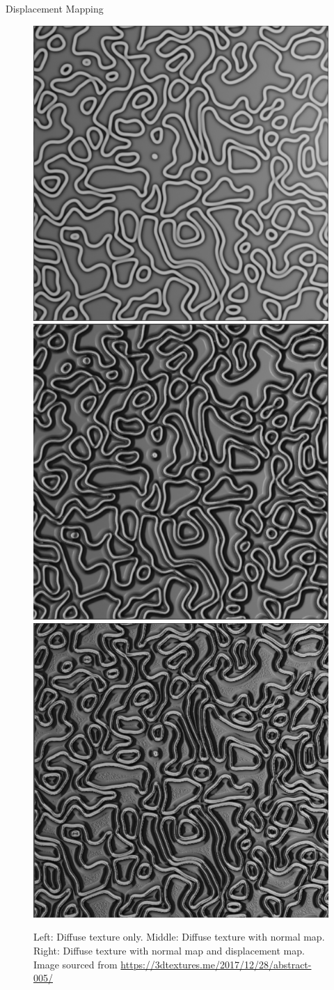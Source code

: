 \documentclass{beamer}
\begin{document}
\begin{frame}[fragile]{Displacement Mapping}
    \begin{figure}
        \centering
        \includegraphics[width=0.30\linewidth]{images/diffuse_only.png}
        \includegraphics[width=0.30\linewidth]{images/diffuse_with_normal.png}
        \includegraphics[width=0.30\linewidth]{images/diffuse_normal_displacement.png}
        \caption{
            Left: Diffuse texture only. Middle: Diffuse texture with normal map.
            Right: Diffuse texture with normal map and displacement map.
            \footnotesize{Image sourced from \url{https://3dtextures.me/2017/12/28/abstract-005/}}}
    \end{figure}
\end{frame}
\end{document}
